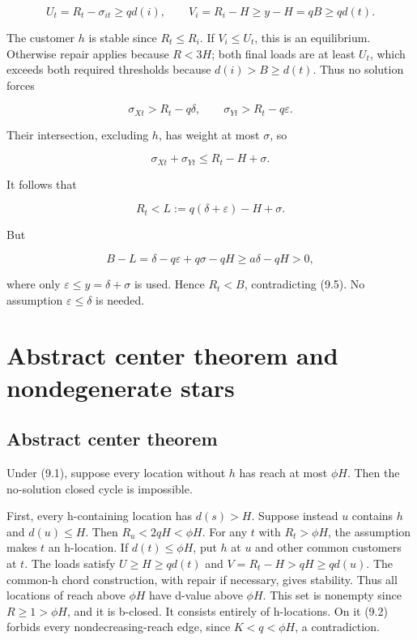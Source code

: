 \documentclass[11pt,a4paper]{article}
\begin{document}
\[
U_t=R_t-\sigma_{it}\ge qd(i),\qquad V_i=R_i-H\ge y-H=qB\ge qd(t).
\]

The customer \(h\) is stable since \(R_t\le R_i\). If \(V_i\le U_t\), this is an equilibrium. Otherwise repair applies because \(R<3H\); both final loads are at least \(U_t\), which exceeds both required thresholds because \(d(i)>B\ge d(t)\). Thus no solution forces

\[
\sigma_{Xt}>R_t-q\delta,\qquad \sigma_{Yt}>R_t-q\varepsilon.
\]

Their intersection, excluding \(h\), has weight at most \(\sigma\), so

\[
\sigma_{Xt}+\sigma_{Yt}\le R_t-H+\sigma.
\]

It follows that

\[
R_t<L:=q(\delta+\varepsilon)-H+\sigma.
\]

But

\[
B-L=\delta-q\varepsilon+q\sigma-qH
\ge a\delta-qH>0,
\]

where only \(\varepsilon\le y=\delta+\sigma\) is used. Hence \(R_t<B\), contradicting (9.5). No assumption \(\varepsilon\le\delta\) is needed.

\hypertarget{abstract-center-theorem-and-nondegenerate-stars}{%
\section{Abstract center theorem and nondegenerate stars}\label{abstract-center-theorem-and-nondegenerate-stars}}

\hypertarget{abstract-center-theorem}{%
\subsection{Abstract center theorem}\label{abstract-center-theorem}}

Under (9.1), suppose every location without \(h\) has reach at most \(\phi H\). Then the no-solution closed cycle is impossible.

First, every h-containing location has \(d(s)>H\). Suppose instead \(u\) contains \(h\) and \(d(u)\le H\). Then \(R_u<2qH<\phi H\). For any \(t\) with \(R_t>\phi H\), the assumption makes \(t\) an h-location. If \(d(t)\le\phi H\), put \(h\) at \(u\) and other common customers at \(t\). The loads satisfy \(U\ge H\ge qd(t)\) and \(V=R_t-H>qH\ge qd(u)\). The common-h chord construction, with repair if necessary, gives stability. Thus all locations of reach above \(\phi H\) have d-value above \(\phi H\). This set is nonempty since \(R\ge1>\phi H\), and it is b-closed. It consists entirely of h-locations. On it (9.2) forbids every nondecreasing-reach edge, since \(K<q<\phi H\), a contradiction.
\end{document}
